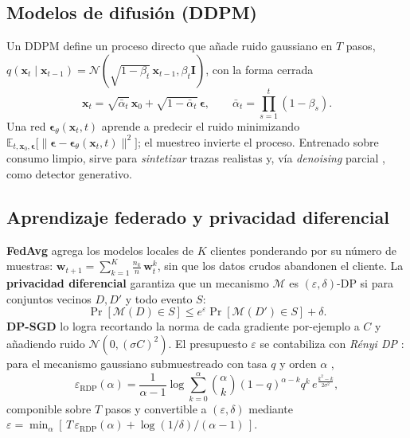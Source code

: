 \subsection{Modelos de difusión (DDPM)}
\label{sec:teo-ddpm}
Un DDPM \cite{ho2020ddpm} define un proceso directo que añade ruido gaussiano en $T$ pasos, $q(\bm x_t\mid\bm x_{t-1})=\mathcal N(\sqrt{1-\beta_t}\,\bm x_{t-1},\beta_t\bm I)$, con la forma cerrada
\begin{equation}
\bm x_t=\sqrt{\bar\alpha_t}\,\bm x_0+\sqrt{1-\bar\alpha_t}\,\bm\epsilon,\qquad \bar\alpha_t=\textstyle\prod_{s=1}^{t}(1-\beta_s).
\label{eq:ddpm_forward}
\end{equation}
Una red $\bm\epsilon_\theta(\bm x_t,t)$ aprende a predecir el ruido minimizando $\mathbb E_{t,\bm x_0,\bm\epsilon}\big[\lVert\bm\epsilon-\bm\epsilon_\theta(\bm x_t,t)\rVert^2\big]$; el muestreo invierte el proceso. Entrenado sobre consumo limpio, sirve para \emph{sintetizar} trazas realistas y, vía \emph{denoising} parcial \cite{wyatt2022anoddpm}, como detector generativo.

\subsection{Aprendizaje federado y privacidad diferencial}
\label{sec:teo-feddp}
\textbf{FedAvg} \cite{mcmahan2017fedavg} agrega los modelos locales de $K$ clientes ponderando por su número de muestras: $\bm w_{t+1}=\sum_{k=1}^{K}\frac{n_k}{n}\,\bm w_t^{k}$, sin que los datos crudos abandonen el cliente. La \textbf{privacidad diferencial} \cite{dwork2014dp} garantiza que un mecanismo $\mathcal M$ es $(\varepsilon,\delta)$-DP si para conjuntos vecinos $D,D'$ y todo evento $S$:
\begin{equation}
\Pr[\mathcal M(D)\in S]\le e^{\varepsilon}\Pr[\mathcal M(D')\in S]+\delta.
\label{eq:dp}
\end{equation}
\textbf{DP-SGD} \cite{abadi2016dpsgd} lo logra recortando la norma de cada gradiente por-ejemplo a $C$ y añadiendo ruido $\mathcal N(0,(\sigma C)^2)$. El presupuesto $\varepsilon$ se contabiliza con \emph{Rényi DP} \cite{mironov2017rdp}: para el mecanismo gaussiano submuestreado con tasa $q$ y orden $\alpha$ \cite{mironov2019sgm},
\begin{equation}
\varepsilon_{\mathrm{RDP}}(\alpha)=\frac{1}{\alpha-1}\log\sum_{k=0}^{\alpha}\binom{\alpha}{k}(1-q)^{\alpha-k}q^{k}\,e^{\frac{k^2-k}{2\sigma^2}},
\label{eq:rdp}
\end{equation}
componible sobre $T$ pasos y convertible a $(\varepsilon,\delta)$ mediante $\varepsilon=\min_\alpha[\,T\,\varepsilon_{\mathrm{RDP}}(\alpha)+\log(1/\delta)/(\alpha-1)\,]$.

